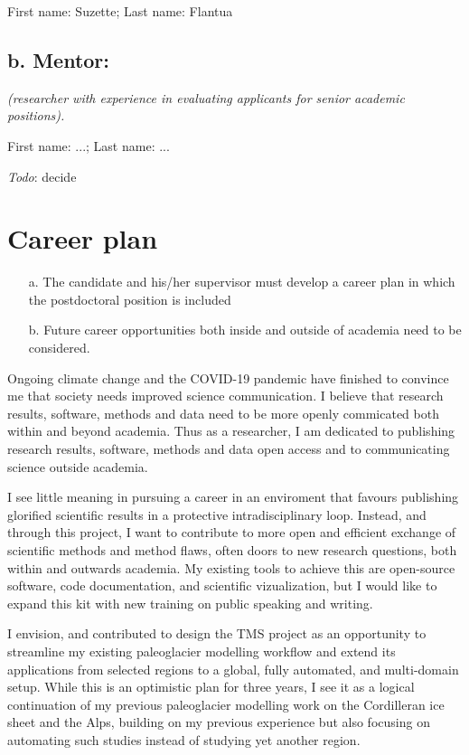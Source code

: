 \documentclass{article}
\renewcommand{\cvdoubleitem}[4]{#1: #2; #3: #4}
\newcommand{\names}[2]{\cvdoubleitem{First name}{#1}{Last name}{#2}}
\newcommand{\guideline}[1]{{\color{color2}\itshape{#1}}}
\newcommand{\todo}[1]{{\color{red}\emph{Todo}: #1}}
\begin{document}
    \names{Suzette}{Flantua}

\subsection{b. Mentor:}

    \guideline{
        (researcher with experience in evaluating applicants for senior
        academic positions).}

    \names{...}{...}

    \todo{decide}


\section{Career plan}

    \guideline{
        \begin{itemize}
          \item[a.] The candidate and his/her supervisor must develop a career
            plan in which the postdoctoral position is included
          \item[b.] Future career opportunities both inside and outside of
            academia need to be considered.
        \end{itemize}}

    Ongoing climate change and the COVID-19 pandemic have finished to convince
    me that society needs improved science communication. I believe that
    research results, software, methods and data need to be more openly
    commicated both within and beyond academia. Thus as a researcher, I am
    dedicated to publishing research results, software, methods and data open
    access and to communicating science outside academia.

    I see little meaning in pursuing a career in an enviroment that favours
    publishing glorified scientific results in a protective intradisciplinary
    loop. Instead, and through this project, I want to contribute to more open
    and efficient exchange of scientific methods and method flaws, often doors
    to new research questions, both within and outwards academia. My existing
    tools to achieve this are open-source software, code documentation, and
    scientific vizualization, but I would like to expand this kit with new
    training on public speaking and writing.

    I envision, and contributed to design the TMS project as an opportunity to
    streamline my existing paleoglacier modelling workflow and extend its
    applications from selected regions to a global, fully automated, and
    multi-domain setup. While this is an optimistic plan for three years, I
    see it as a logical continuation of my previous paleoglacier modelling work
    on the Cordilleran ice sheet and the Alps, building on my previous
    experience but also focusing on automating such studies instead of studying
    yet another region.
\end{document}
